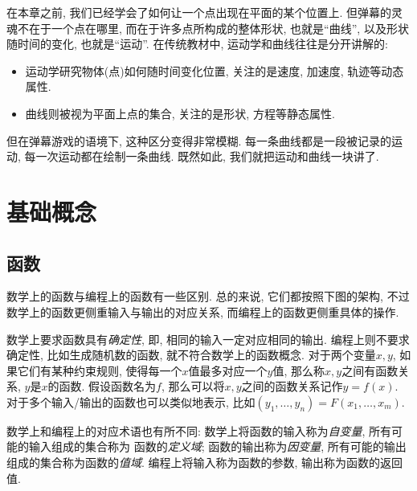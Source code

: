 在本章之前, 我们已经学会了如何让一个点出现在平面的某个位置上.
但弹幕的灵魂不在于一个点在哪里, 而在于许多点所构成的整体形状,
也就是``曲线'', 以及形状随时间的变化, 也就是``运动''.
在传统教材中, 运动学和曲线往往是分开讲解的:
\begin{itemize}
  \item 运动学研究物体(点)如何随时间变化位置,
        关注的是速度, 加速度, 轨迹等动态属性.
  \item 曲线则被视为平面上点的集合,
        关注的是形状, 方程等静态属性.
\end{itemize}
但在弹幕游戏的语境下, 这种区分变得非常模糊.
每一条曲线都是一段被记录的运动, 每一次运动都在绘制一条曲线.
既然如此, 我们就把运动和曲线一块讲了.

\section{基础概念} \label{sec:curve-basic}

\subsection{函数}

数学上的函数与编程上的函数有一些区别.
总的来说, 它们都按照下图的架构,
不过数学上的函数更侧重输入与输出的对应关系,
而编程上的函数更侧重具体的操作.

\begin{center}
\end{center}

数学上要求函数具有\emph{确定性}, 即, 相同的输入一定对应相同的输出.
编程上则不要求确定性, 比如生成随机数的函数, 就不符合数学上的函数概念.
对于两个变量$x,y$, 如果它们有某种约束规则,
使得每一个$x$值最多对应一个$y$值,
那么称$x,y$之间有函数关系, $y$是$x$的函数.
假设函数名为$f$, 那么可以将$x,y$之间的函数关系记作$y = f(x)$.
对于多个输入/输出的函数也可以类似地表示,
比如$(y_1,\dots,y_n) = F(x_1,\dots,x_m)$.

数学上和编程上的对应术语也有所不同:
数学上将函数的输入称为\emph{自变量}, 所有可能的输入组成的集合称为
函数的\emph{定义域}; 函数的输出称为\emph{因变量},
所有可能的输出组成的集合称为函数的\emph{值域}.
编程上将输入称为函数的参数, 输出称为函数的返回值.


